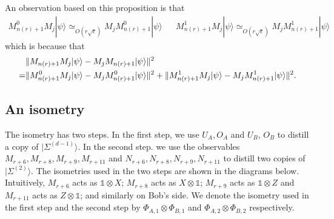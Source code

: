 \documentclass[11pt,letterpaper]{article}
\newcommand{\ket}[1]{|#1\rangle}
\newcommand{\x}{\otimes}
\DeclarePairedDelimiter{\norm}{\lVert}{\rVert}
\newcommand{\1}{\mathbb{1}}
\newcommand{\EPR}[1]{\Sigma^{(#1)}}
\newcommand{\nr}{n(r)}
\newcommand{\se}{\sqrt{\epsilon}}
\newcommand{\appd}[1]{\simeq_{#1}}
\theoremstyle{definition}
\begin{document}
An observation based on this proposition is that 
\begin{align}
	M_{\nr+1}^0 M_j \ket{\psi} \appd{O(r\se)} M_j M_{\nr+1}^0 \ket{\psi} &&
	M_{\nr+1}^1 M_j \ket{\psi} \appd{O(r\se)} M_j M_{\nr+1}^1 \ket{\psi} &&
\end{align}
which is because that 
\begin{align}
	&\norm{M_{\nr+1} M_j \ket{\psi} - M_j M_{\nr+1} \ket{\psi}}^2 \\
	=& \norm{M_{\nr+1}^0 M_j  \ket{\psi} - M_j M_{\nr+1}^0 \ket{\psi}}^2
	+ \norm{M_{\nr+1}^1 M_j  \ket{\psi} - M_j M_{\nr+1}^1\ket{\psi}}^2.
\end{align}

\subsection{An isometry}
\label{sec:isometry}
The isometry has two steps. In the first step, 
we use $U_A, O_A$ and $U_B$, $O_B$ to distill a copy of $\ket{\EPR{d-1}}$.
In the second step. we use the observables $M_{r+6},M_{r+8}, M_{r+9}, M_{r+11}$ and 
$N_{r+6}, N_{r+8}, N_{r+9}, N_{r+11}$ to distill two copies of $\ket{\EPR{2}}$.
The isometries used in the two steps are 
shown in the diagrams below. Intuitively, $M_{r+6}$ acts as $\1 \x X$; $M_{r+8}$ acts as $X \x \1 $;
$M_{r+9}$ acts as $\1 \x Z$ and $M_{r+11}$ acts as $Z \x \1$; and similarly on Bob's side.
We denote the isometry used in the first step and the second step by $\Phi_{A,1} \x \Phi_{B,1}$ and 
$\Phi_{A,2} \x \Phi_{B,2}$ respectively.
\end{document}
